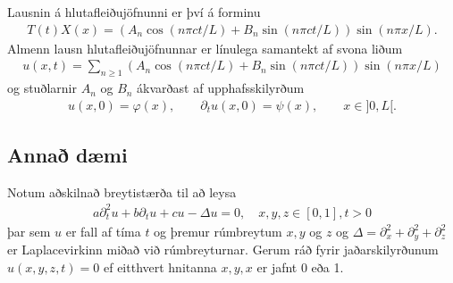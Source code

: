 \documentclass[a4paper,10pt,icelandic]{sphinxmanual}
\begin{document}
Lausnin á hlutafleiðujöfnunni er því á forminu
\begin{equation*}
\begin{split}T(t)X(x) = (A_n \cos(n\pi ct/L) + B_n \sin(n\pi c t/L))\sin(n\pi x/L).\end{split}
\end{equation*}
Almenn lausn hlutafleiðujöfnunnar er línulega samantekt af svona liðum
\begin{equation*}
\begin{split}u(x,t) = \sum_{n\geq 1} (A_n\cos(n\pi ct/L) + B_n \sin(n\pi c t/L))\sin(n\pi x/L)\end{split}
\end{equation*}
og stuðlarnir \(A_n\) og \(B_n\) ákvarðast af upphafsskilyrðum
\begin{equation*}
\begin{split}u(x,0)=\varphi(x), \qquad {\partial}_tu(x,0)={\psi}(x), \qquad x\in
 ]0,L[.\end{split}
\end{equation*}

\subsection{Annað dæmi}
\label{\detokenize{Kafli03:anna-daemi}}
Notum aðskilnað breytistærða til að leysa
\begin{equation*}
\begin{split}a\partial_t^2u+b\partial_tu+cu-\Delta u=0, \quad x,y,z \in [0,1], t>0\end{split}
\end{equation*}
þar sem \(u\) er fall af tíma \(t\) og þremur
rúmbreytum \(x,y\) og \(z\) og \(\Delta=\partial_x^2+\partial_y^2+\partial_z^ 2\) er
Laplace\textendash{}virkinn miðað við rúmbreyturnar.  Gerum ráð fyrir jaðarskilyrðunum \(u(x,y,z,t) = 0\) ef eitthvert hnitanna \(x,y,x\) er jafnt 0 eða 1.
\end{document}
